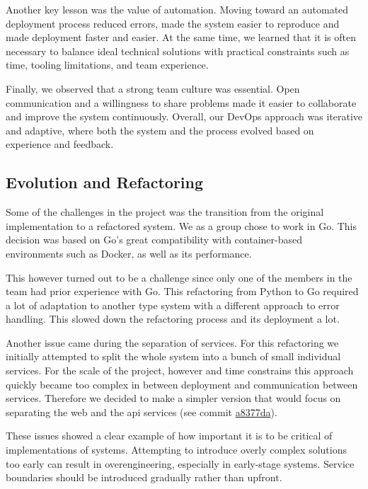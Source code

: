 Another key lesson was the value of automation. Moving toward an automated deployment process reduced errors, made the system easier to reproduce and made deployment faster and easier. At the same time, we learned that it is often necessary to balance ideal technical solutions with practical constraints such as time, tooling limitations, and team experience.

Finally, we observed that a strong team culture was essential. Open communication and a willingness to share problems made it easier to collaborate and improve the system continuously. Overall, our DevOps approach was iterative and adaptive, where both the system and the process evolved based on experience and feedback.

\subsection{Evolution and Refactoring }

Some of the challenges in the project was the transition from the original implementation to a refactored system. We as a group chose to work in Go. This decision was based on Go’s great compatibility with container-based environments such as Docker, as well as its performance.

This however turned out to be a challenge since only one of the members in the team had prior experience with Go. This refactoring from Python to Go required a lot of adaptation to another type system with a different approach to error handling. This slowed down the refactoring process and its deployment a lot.

Another issue came during the separation of services. For this refactoring we initially attempted to split the whole system into a bunch of small individual services. For the scale of the project, however and time constrains this approach quickly became too complex in between deployment and communication between services. Therefore we decided to make a simpler version that would focus on separating the web and the api services (see commit \href{https://github.com/sebsthiel/minitwit-devops/commit/a8377dab525ee6f05cba84210267da76e0edc6fe}{a8377da}).


These issues showed a clear example of how important it is to be critical of implementations of systems. Attempting to introduce overly complex solutions too early can result in overengineering, especially in early-stage systems. Service boundaries should be introduced gradually rather than upfront. 

